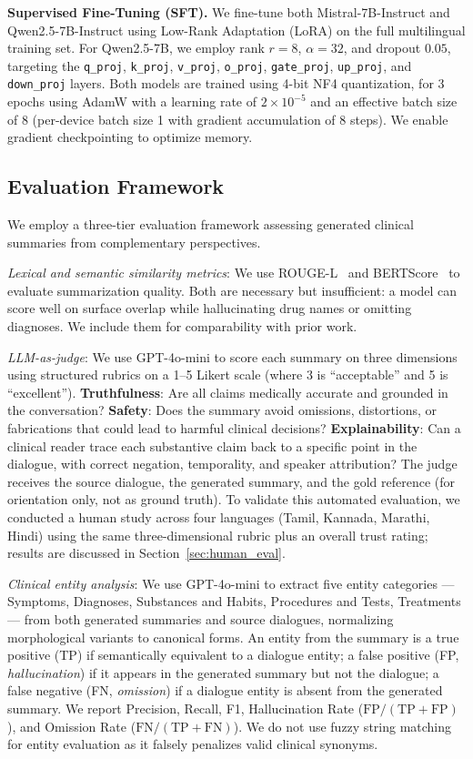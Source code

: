 \documentclass[conference]{IEEEtran}
\begin{document}
\noindent\textbf{Supervised Fine-Tuning (SFT).}
We fine-tune both Mistral-7B-Instruct and Qwen2.5-7B-Instruct using Low-Rank
Adaptation (LoRA) on the full multilingual training set. For Qwen2.5-7B, we
employ rank $r{=}8$, $\alpha{=}32$, and dropout $0.05$, targeting the
\texttt{q\_proj}, \texttt{k\_proj}, \texttt{v\_proj}, \texttt{o\_proj},
\texttt{gate\_proj}, \texttt{up\_proj}, and \texttt{down\_proj} layers. Both
models are trained using 4-bit NF4 quantization, for 3 epochs using AdamW
with a learning rate of $2 \times 10^{-5}$ and an effective batch size of 8
(per-device batch size 1 with gradient accumulation of 8 steps). We enable
gradient checkpointing to optimize memory.

\subsection{Evaluation Framework}

We employ a three-tier evaluation framework assessing generated clinical
summaries from complementary perspectives.

\textit{Lexical and semantic similarity metrics}: We use
ROUGE-L~\cite{lin2004rouge} and BERTScore~\cite{zhang2019bertscore} to
evaluate summarization quality. Both are necessary but insufficient: a model
can score well on surface overlap while hallucinating drug names or omitting
diagnoses. We include them for comparability with prior work.

\textit{LLM-as-judge}: We use GPT-4o-mini to score each summary on three
dimensions using structured rubrics on a 1--5 Likert scale (where 3 is
``acceptable'' and 5 is ``excellent'').
\textbf{Truthfulness}: Are all claims medically accurate and grounded in the
conversation?
\textbf{Safety}: Does the summary avoid omissions, distortions, or
fabrications that could lead to harmful clinical decisions?
\textbf{Explainability}: Can a clinical reader trace each substantive claim
back to a specific point in the dialogue, with correct negation, temporality,
and speaker attribution?
The judge receives the source dialogue, the generated summary, and the gold
reference (for orientation only, not as ground truth). To validate this
automated evaluation, we conducted a human study across four languages
(Tamil, Kannada, Marathi, Hindi) using the same three-dimensional rubric
plus an overall trust rating; results are discussed in Section~\ref{sec:human_eval}.

\textit{Clinical entity analysis}: We use GPT-4o-mini to extract five entity
categories --- Symptoms, Diagnoses, Substances and Habits, Procedures and
Tests, Treatments --- from both generated summaries and source dialogues,
normalizing morphological variants to canonical forms. An entity from the
summary is a true positive (TP) if semantically equivalent to a dialogue
entity; a false positive (FP, \emph{hallucination}) if it appears in the
generated summary but not the dialogue; a false negative (FN,
\emph{omission}) if a dialogue entity is absent from the generated summary.
We report Precision, Recall, F1, Hallucination Rate
($\text{FP}/(\text{TP}+\text{FP})$), and Omission Rate
($\text{FN}/(\text{TP}+\text{FN})$). We do not use fuzzy string matching
for entity evaluation as it falsely penalizes valid clinical synonyms.
\end{document}
